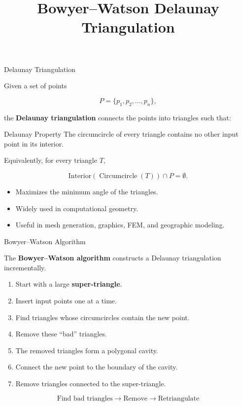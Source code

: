 \documentclass[aspectratio=169]{beamer}
\title{Bowyer--Watson Delaunay Triangulation}
\author{}
\institute{}
\date{}
\begin{document}
\begin{frame}
    \titlepage
\end{frame}

\begin{frame}{Delaunay Triangulation}

Given a set of points

\[
P = \{p_1,p_2,\ldots,p_n\},
\]

the \textbf{Delaunay triangulation} connects the points into triangles
such that:

\begin{block}{Delaunay Property}
The circumcircle of every triangle contains no other input point
in its interior.
\end{block}

\vspace{0.3cm}

Equivalently, for every triangle $T$,

\[
\text{Interior}(\operatorname{Circumcircle}(T))
\cap P = \emptyset.
\]

\begin{itemize}
    \item Maximizes the minimum angle of the triangles.
    \item Widely used in computational geometry.
    \item Useful in mesh generation, graphics, FEM, and geographic modeling.
\end{itemize}

\end{frame}

\begin{frame}{Bowyer--Watson Algorithm}

The \textbf{Bowyer--Watson algorithm} constructs a Delaunay
triangulation incrementally.

\begin{enumerate}
    \item Start with a large \textbf{super-triangle}.
    \item Insert input points one at a time.
    \item Find triangles whose circumcircles contain the new point.
    \item Remove these ``bad'' triangles.
    \item The removed triangles form a polygonal cavity.
    \item Connect the new point to the boundary of the cavity.
    \item Remove triangles connected to the super-triangle.
\end{enumerate}

\begin{center}
\[
\boxed{\text{Find bad triangles}
\rightarrow
\text{Remove}
\rightarrow
\text{Retriangulate}}
\]
\end{center}

\end{frame}
\end{document}
